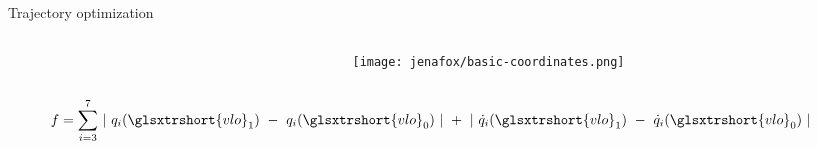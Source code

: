 \begin{frame}{Trajectory optimization~\cite{Rummel2010}~\cite{Renjewski2013}}%
    \begin{columns}[T,onlytextwidth]%
        \begin{column}[T]{0.5\textwidth}%
            \begin{figure}[htb]%
                \centering%
                
            \end{figure}%
        \end{column}%
        \begin{column}[T]{0.35\textwidth}%
            \begin{figure}[htb]%
                \centering%
                \texttt{[image: jenafox/basic-coordinates.png]}
            \end{figure}%
        \end{column}%
    \end{columns}%
    \begin{align}
        f &= \sum_{i = 3}^{7}~\lvert~q_i(\glsxtrshort{vlo}_1)~-~q_i(\glsxtrshort{vlo}_0)~\rvert~+~\lvert~\dot{q}_i(\glsxtrshort{vlo}_1)~-~\dot{q}_i(\glsxtrshort{vlo}_0)~\rvert \notag
    \end{align}
\end{frame}%
%